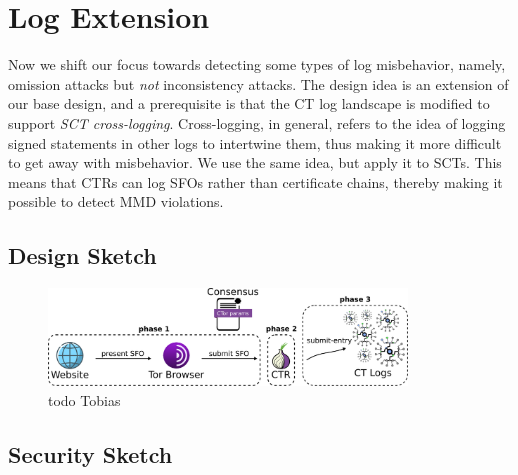 \section{Log Extension} \label{sec:log}
Now we shift our focus towards detecting some types of log misbehavior, namely,
omission attacks but \emph{not} inconsistency attacks.  The design idea is an
extension of our base design, and a prerequisite is that the CT log landscape
is modified to support \emph{SCT cross-logging}.  Cross-logging, in general,
refers to the idea of logging signed statements in other logs to intertwine
them, thus making it more difficult to get away with
misbehavior.  We use the same idea, but apply it to SCTs.  This means that CTRs
can log SFOs rather than certificate chains, thereby making it possible to
detect MMD violations.

\subsection{Design Sketch}
\begin{figure}
    \centering
    \includegraphics[width=0.85\textwidth]{img/design-log}
    \caption{todo Tobias}
    \label{fig:design-log}
\end{figure}

%
%

%
%

%
%

%
%

%
%

\subsection{Security Sketch}
%
%
